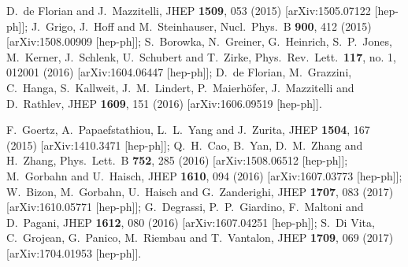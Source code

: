 \documentclass[aps,prd,11pt,tightenlines,superscriptaddress,nofootinbib,preprintnumbers,notitlepage]{revtex4-1}
\begin{document}
\begin{thebibliography}{99}
  D.~de Florian and J.~Mazzitelli,
  JHEP {\bf 1509}, 053 (2015)
  [arXiv:1505.07122 [hep-ph]];
  J.~Grigo, J.~Hoff and M.~Steinhauser,
  Nucl.\ Phys.\ B {\bf 900}, 412 (2015)
  [arXiv:1508.00909 [hep-ph]];
  S.~Borowka, N.~Greiner, G.~Heinrich, S.~P.~Jones, M.~Kerner, J.~Schlenk, U.~Schubert and T.~Zirke,
  Phys.\ Rev.\ Lett.\  {\bf 117}, no. 1, 012001 (2016)
  [arXiv:1604.06447 [hep-ph]];
  D.~de Florian, M.~Grazzini, C.~Hanga, S.~Kallweit, J.~M.~Lindert, P.~Maierh\"ofer, J.~Mazzitelli and D.~Rathlev,
  JHEP {\bf 1609}, 151 (2016)
  [arXiv:1606.09519 [hep-ph]].

  F.~Goertz, A.~Papaefstathiou, L.~L.~Yang and J.~Zurita,
  JHEP {\bf 1504}, 167 (2015)
  [arXiv:1410.3471 [hep-ph]];
  Q.~H.~Cao, B.~Yan, D.~M.~Zhang and H.~Zhang,
  Phys.\ Lett.\ B {\bf 752}, 285 (2016)
  [arXiv:1508.06512 [hep-ph]];
  M.~Gorbahn and U.~Haisch,
  JHEP {\bf 1610}, 094 (2016)
  [arXiv:1607.03773 [hep-ph]];
  W.~Bizon, M.~Gorbahn, U.~Haisch and G.~Zanderighi,
  JHEP {\bf 1707}, 083 (2017)
  [arXiv:1610.05771 [hep-ph]];
  G.~Degrassi, P.~P.~Giardino, F.~Maltoni and D.~Pagani,
  JHEP {\bf 1612}, 080 (2016)
  [arXiv:1607.04251 [hep-ph]];
  S.~Di Vita, C.~Grojean, G.~Panico, M.~Riembau and T.~Vantalon,
  JHEP {\bf 1709}, 069 (2017)
  [arXiv:1704.01953 [hep-ph]].


\end{thebibliography}
\end{document}
